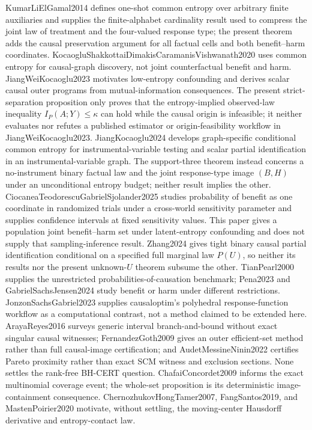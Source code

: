 \documentclass{article}
\begin{document}
KumarLiElGamal2014 defines one-shot common entropy over arbitrary finite auxiliaries and supplies the finite-alphabet cardinality result used to compress the joint law of treatment and the four-valued response type; the present theorem adds the causal preservation argument for all factual cells and both benefit--harm coordinates. KocaogluShakkottaiDimakisCaramanisVishwanath2020 uses common entropy for causal-graph discovery, not joint counterfactual benefit and harm. JiangWeiKocaoglu2023 motivates low-entropy confounding and derives scalar causal outer programs from mutual-information consequences. The present strict-separation proposition only proves that the entropy-implied observed-law inequality \(I_P(A;Y)\leq\kappa\) can hold while the causal origin is infeasible; it neither evaluates nor refutes a published estimator or origin-feasibility workflow in JiangWeiKocaoglu2023. JiangKocaoglu2024 develops graph-specific conditional common entropy for instrumental-variable testing and scalar partial identification in an instrumental-variable graph. The support-three theorem instead concerns a no-instrument binary factual law and the joint response-type image \((B,H)\) under an unconditional entropy budget; neither result implies the other. CiocaneaTeodorescuGabrielSjolander2025 studies probability of benefit as one coordinate in randomized trials under a cross-world sensitivity parameter and supplies confidence intervals at fixed sensitivity values. This paper gives a population joint benefit--harm set under latent-entropy confounding and does not supply that sampling-inference result. Zhang2024 gives tight binary causal partial identification conditional on a specified full marginal law \(P(U)\), so neither its results nor the present unknown-\(U\) theorem subsume the other. TianPearl2000 supplies the unrestricted probabilities-of-causation benchmark; Pena2023 and GabrielSachsJensen2024 study benefit or harm under different restrictions. JonzonSachsGabriel2023 supplies causaloptim's polyhedral response-function workflow as a computational contrast, not a method claimed to be extended here. ArayaReyes2016 surveys generic interval branch-and-bound without exact singular causal witnesses; FernandezGoth2009 gives an outer efficient-set method rather than full causal-image certification; and AudetMessineNinin2022 certifies Pareto proximity rather than exact SCM witness and exclusion sections. None settles the rank-free BH-CERT question. ChafaiConcordet2009 informs the exact multinomial coverage event; the whole-set proposition is its deterministic image-containment consequence. ChernozhukovHongTamer2007, FangSantos2019, and MastenPoirier2020 motivate, without settling, the moving-center Hausdorff derivative and entropy-contact law.
\end{document}
